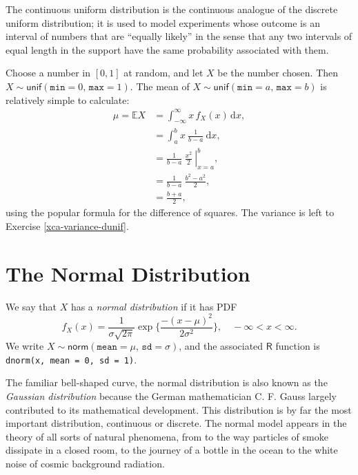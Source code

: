 \documentclass[captions=tableheading]{scrbook}
\begin{document}
The continuous uniform distribution is the continuous analogue of the discrete uniform distribution; it is used to model experiments whose outcome is an interval of numbers that are ``equally likely'' in the sense that any two intervals of equal length in the support have the same probability associated with them.

\begin{example}
Choose a number in \( [0,1] \) at random, and let \(X\) be the number chosen. Then \(X\sim\mathsf{unif}(\mathtt{min}=0,\,\mathtt{max}=1)\).
The mean of \(X\sim\mathsf{unif}(\mathtt{min}=a,\,\mathtt{max}=b)\) is relatively simple to calculate:
\begin{align*}
\mu=\mathbb{E} X & =\int_{-\infty}^{\infty}x\, f_{X}(x)\,\mathrm{d} x,\\
 & =\int_{a}^{b}x\ \frac{1}{b-a}\ \mathrm{d} x,\\
 & =\left.\frac{1}{b-a}\ \frac{x^{2}}{2}\ \right|_{x=a}^{b},\\
 & =\frac{1}{b-a}\ \frac{b^{2}-a^{2}}{2},\\
 & =\frac{b+a}{2},
\end{align*}
using the popular formula for the difference of squares. The variance is left to Exercise \ref{xca-variance-dunif}.
\end{example}
\section{The Normal Distribution}
\label{sec-6-3}
\label{sec-The-Normal-Distribution}


We say that \(X\) has a \emph{normal distribution} if it has PDF
\begin{equation}
f_{X}(x)=\frac{1}{\sigma\sqrt{2\pi}}\exp \{ \frac{-(x-\mu)^{2}}{2\sigma^{2}} \},\quad -\infty < x < \infty.
\end{equation}
We write \(X\sim\mathsf{norm}(\mathtt{mean}=\mu,\,\mathtt{sd}=\sigma)\), and the associated \(\mathsf{R}\) function is \texttt{dnorm(x, mean = 0, sd = 1)}.

The familiar bell-shaped curve, the normal distribution is also known as the \emph{Gaussian distribution} because the German mathematician C. F. Gauss largely contributed to its mathematical development. This distribution is by far the most important distribution, continuous or discrete. The normal model appears in the theory of all sorts of natural phenomena, from to the way particles of smoke dissipate in a closed room, to the journey of a bottle in the ocean to the white noise of cosmic background radiation.
\end{document}
